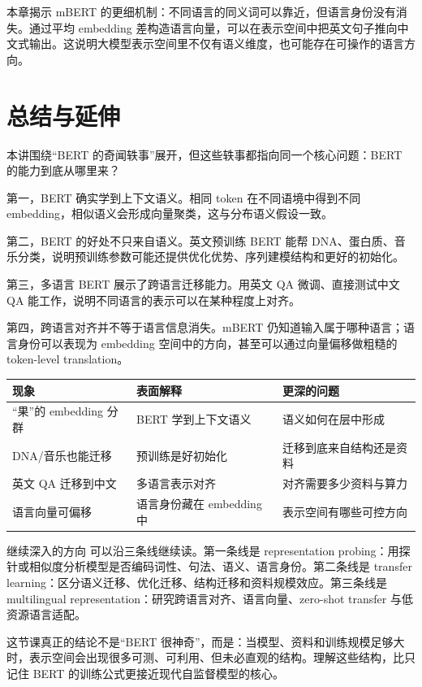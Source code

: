 \documentclass[a4paper]{article}
\begin{document}
本章揭示 mBERT 的更细机制：不同语言的同义词可以靠近，但语言身份没有消失。通过平均 embedding 差构造语言向量，可以在表示空间中把英文句子推向中文式输出。这说明大模型表示空间里不仅有语义维度，也可能存在可操作的语言方向。

\section{总结与延伸}

本讲围绕“BERT 的奇闻轶事”展开，但这些轶事都指向同一个核心问题：BERT 的能力到底从哪里来？

第一，BERT 确实学到上下文语义。相同 token 在不同语境中得到不同 embedding，相似语义会形成向量聚类，这与分布语义假设一致。

第二，BERT 的好处不只来自语义。英文预训练 BERT 能帮 DNA、蛋白质、音乐分类，说明预训练参数可能还提供优化优势、序列建模结构和更好的初始化。

第三，多语言 BERT 展示了跨语言迁移能力。用英文 QA 微调、直接测试中文 QA 能工作，说明不同语言的表示可以在某种程度上对齐。

第四，跨语言对齐并不等于语言信息消失。mBERT 仍知道输入属于哪种语言；语言身份可以表现为 embedding 空间中的方向，甚至可以通过向量偏移做粗糙的 token-level translation。

\begin{center}
\begin{tabular}{L{0.24\textwidth} L{0.33\textwidth} L{0.31\textwidth}}
\toprule
现象 & 表面解释 & 更深的问题 \\
\midrule
“果”的 embedding 分群 & BERT 学到上下文语义 & 语义如何在层中形成 \\
DNA/音乐也能迁移 & 预训练是好初始化 & 迁移到底来自结构还是资料 \\
英文 QA 迁移到中文 & 多语言表示对齐 & 对齐需要多少资料与算力 \\
语言向量可偏移 & 语言身份藏在 embedding 中 & 表示空间有哪些可控方向 \\
\bottomrule
\end{tabular}
\end{center}

\begin{knowledgebox}{继续深入的方向}
    可以沿三条线继续读。第一条线是 representation probing：用探针或相似度分析模型是否编码词性、句法、语义、语言身份。第二条线是 transfer learning：区分语义迁移、优化迁移、结构迁移和资料规模效应。第三条线是 multilingual representation：研究跨语言对齐、语言向量、zero-shot transfer 与低资源语言适配。
\end{knowledgebox}

这节课真正的结论不是“BERT 很神奇”，而是：当模型、资料和训练规模足够大时，表示空间会出现很多可测、可利用、但未必直观的结构。理解这些结构，比只记住 BERT 的训练公式更接近现代自监督模型的核心。
\end{document}
